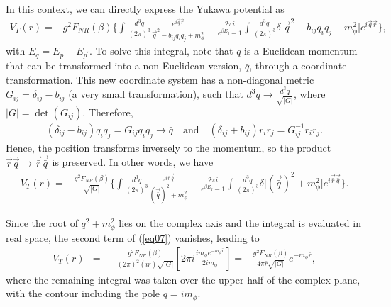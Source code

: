 \documentclass[11pt,showpacs,preprintnumbers,amsmath,amssymb,prd,nofootinbib,superscriptaddress]{revtex4-2}
\begin{document}
{In this context, we can directly express the Yukawa potential as
\begin{eqnarray}
    V_T(r)=-g^2F_{NR}(\beta)\biggl\{\int\frac{d^3q}{(2\pi)^3}\frac{e^{i\vec{q}\vec{r}}}{\vec{q}^2-b_{ij}q_iq_j+m_\phi^2}-\frac{2\pi i}{e^{\beta E_q}-1}\int\frac{d^3q}{(2\pi)^3}\delta\biggl[\vec{q}^2-b_{ij}q_iq_j+m_\phi^2\biggr]e^{i\vec{q}\vec{r}}\biggr\},
\end{eqnarray}
with $E_q=E_p+E_{p^\prime}$. To solve this integral, note that $q$ is a Euclidean momentum that can be transformed into a non-Euclidean version, $\bar{q}$, through a coordinate transformation. This new coordinate system has a non-diagonal metric $G_{ij}=\delta_{ij}-b_{ij}$ (a very small transformation), such that $d^3q \to \frac{d^{3}\bar{q}}{\sqrt{|G|}}$, where $|G|=\det(G_{ij})$. Therefore,
\begin{eqnarray}
(\delta_{ij}-b_{ij})q_iq_j=G_{ij}q_iq_j\to\bar{q}\quad \mbox{and}\quad (\delta_{ij}+b_{ij})r_ir_j=G_{ij}^{-1}r_ir_j.
\end{eqnarray}
Hence, the position transforms inversely to the momentum, so the product $\vec{r}\vec{q} \to \vec{\bar{r}}\vec{\bar{q}}$ is preserved. In other words, we have
\begin{eqnarray}
    V_T(r)=-\frac{g^2F_{NR}(\beta)}{\sqrt{|G|}}\biggl\{\int\frac{d^3\bar{q}}{(2\pi)^3}\frac{e^{i\vec{\bar{r}}\vec{\bar{q}}}}{(\vec{\bar{q}})^2+m_\phi^2}-\frac{2\pi i}{e^{\beta E_q}-1}\int\frac{d^3\bar{q}}{(2\pi)^3}\delta\biggl[(\vec{\bar{q}})^2+m_\phi^2\biggr]e^{i\vec{\bar{r}}\vec{\bar{q}}}\biggr\}.\label{eq07}
\end{eqnarray}

Since the root of $q^2 + m_{\phi}^2$ lies on the complex axis and the integral is evaluated in real space, the second term of (\ref{eq07}) vanishes, leading to
\begin{eqnarray}
    V_T(r)&=&%
    -\frac{g^2F_{NR}(\beta)}{(2\pi)^2(i\bar{r})\sqrt{|G|}}\left[2\pi i\frac{im_\phi e^{-m_\phi \bar{r}}}{2im_\phi}\right]=-\frac{g^2F_{NR}(\beta)}{4\pi\bar{r}\sqrt{|G|}}e^{-m_\phi\bar{r}},
\end{eqnarray}
where the remaining integral was taken over the upper half of the complex plane, with the contour including the pole $q = i m_\phi$.

}
\end{document}
